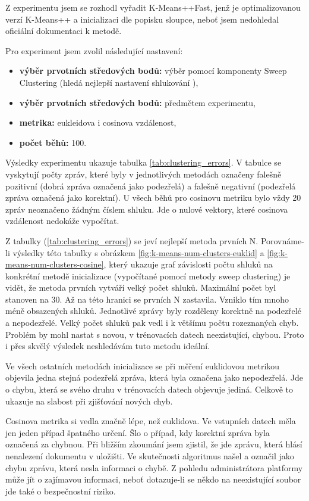 \documentclass[thesis=M,czech]{FITthesis}[2012/10/20]
\begin{document}
		Z experimentu jsem se rozhodl vyřadit K-Means++Fast, jenž je optimalizovanou verzí K-Means++ a inicializaci dle popisku sloupce, neboť jsem nedohledal oficiální dokumentaci k metodě.
		
		Pro experiment jsem zvolil následující nastavení:
		
		\begin{itemize} 
			\item \textbf{výběr prvotních středových bodů: } výběr pomocí komponenty Sweep Clustering (hledá nejlepší nastavení shlukování \cite{sweep-clustering}),
			\item \textbf{výběr prvotních středových bodů: } předmětem experimentu,
			\item \textbf{metrika: } eukleidova i cosinova vzdálenost,
			\item \textbf{počet běhů: } 100.	
		\end{itemize}
		
		Výsledky experimentu ukazuje tabulka \ref{tab:clustering_errors}. V tabulce se vyskytují počty zpráv, které byly v jednotlivých metodách označeny falešně pozitivní (dobrá zpráva označená jako podezřelá) a falešně negativní (podezřelá zpráva označená jako korektní). U všech běhů pro cosinovu metriku bylo vždy 20 zpráv neoznačeno žádným číslem shluku. Jde o nulové vektory, které cosinova vzdálenost nedokáže vypočítat.
		
		Z tabulky (\ref{tab:clustering_errors}) se jeví nejlepší metoda prvních N. Porovnáme-li výsledky této tabulky s obrázkem \ref{fig:k-means-num-clusters-euklid} a \ref{fig:k-means-num-clusters-cosine}, který ukazuje graf závislosti počtu shluků na konkrétní metodě inicializace (vypočítané pomocí metody sweep clustering) je vidět, že metoda prvních vytváří velký počet shluků. Maximální počet byl stanoven na 30. Až na této hranici se prvních N zastavila. Vzniklo tím mnoho méně obsazených shluků. Jednotlivé zprávy byly rozděleny korektně na podezřelé a nepodezřelé. Velký počet shluků pak vedl i k většímu počtu rozeznaných chyb. Problém by mohl nastat s novou, v trénovacích datech neexistující, chybou. Proto i přes skvělý výsledek neshledávám tuto metodu ideální.
		
		Ve všech ostatních metodách inicializace se při měření euklidovou metrikou objevila jedna stejná podezřelá zpráva, která byla označena jako nepodezřelá. Jde o chybu, která se svého druhu v trénovacích datech objevuje jediná. Celkově to ukazuje na slabost při zjišťování nových chyb.
		
		Cosinova metrika si vedla značně lépe, než euklidova. Ve vstupních datech měla jen jeden případ špatného určení. Šlo o případ, kdy korektní zpráva byla označená za chybnou. Při bližším zkoumání jsem zjistil, že jde zprávu, která hlásí nenalezení dokumentu v uložišti. Ve skutečnosti algoritmus našel a označil jako chybu zprávu, která nesla informaci o chybě. Z pohledu administrátora platformy může jít o zajímavou informaci, neboť dotazuje-li se někdo na neexistující soubor jde také o bezpečnostní riziko.
		
\end{document}
